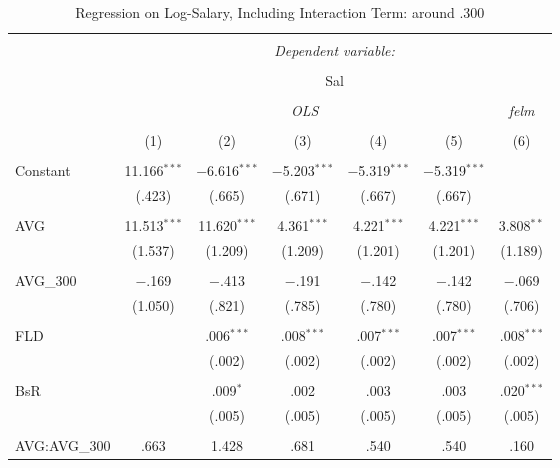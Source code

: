 
\begin{table}[H] \centering
  \caption{Regression on Log-Salary, Including Interaction Term: around .300}
  \label{AVG300_A}
\fontsize{4pt}{4pt}\selectfont
\begin{tabular}{@{\extracolsep{-10pt}}lcccccc}
\\[-1.8ex]\hline
\hline \\[-1.8ex]
 & \multicolumn{6}{c}{\textit{Dependent variable:}} \\
\cline{2-7}
\\[-1.8ex] & \multicolumn{6}{c}{Sal} \\
\\[-1.8ex] & \multicolumn{5}{c}{\textit{OLS}} & \textit{felm} \\
\\[-1.8ex] & (1) & (2) & (3) & (4) & (5) & (6)\\
\hline \\[-1.8ex]
 Constant & 11.166$^{***}$ & $-$6.616$^{***}$ & $-$5.203$^{***}$ & $-$5.319$^{***}$ & $-$5.319$^{***}$ &  \\
  & (.423) & (.665) & (.671) & (.667) & (.667) &  \\
  & & & & & & \\
 AVG & 11.513$^{***}$ & 11.620$^{***}$ & 4.361$^{***}$ & 4.221$^{***}$ & 4.221$^{***}$ & 3.808$^{**}$ \\
  & (1.537) & (1.209) & (1.209) & (1.201) & (1.201) & (1.189) \\
  & & & & & & \\
 AVG\_300 & $-$.169 & $-$.413 & $-$.191 & $-$.142 & $-$.142 & $-$.069 \\
  & (1.050) & (.821) & (.785) & (.780) & (.780) & (.706) \\
  & & & & & & \\
 FLD &  & .006$^{***}$ & .008$^{***}$ & .007$^{***}$ & .007$^{***}$ & .008$^{***}$ \\
  &  & (.002) & (.002) & (.002) & (.002) & (.002) \\
  & & & & & & \\
 BsR &  & .009$^{*}$ & .002 & .003 & .003 & .020$^{***}$ \\
  &  & (.005) & (.005) & (.005) & (.005) & (.005) \\
  & & & & & & \\
 AVG:AVG\_300 & .663 & 1.428 & .681 & .540 & .540 & .160 \\

\end{tabular}
\end{table}
